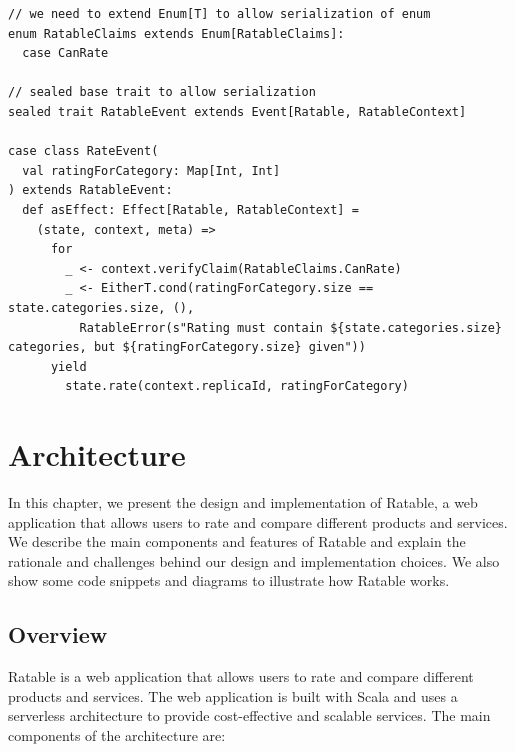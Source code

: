 \documentclass[
	ngerman,
	ruledheaders=section,   %
	class=report,		    %
	thesis={type=bachelor}, %
	accentcolor=9c,			%
	custommargins=true,    %
	marginpar=false,        %
	parskip=half-,          %
	fontsize=11pt,          %
]{tudapub}
\begin{document}
\begin{lstlisting}
// we need to extend Enum[T] to allow serialization of enum
enum RatableClaims extends Enum[RatableClaims]:
  case CanRate

// sealed base trait to allow serialization
sealed trait RatableEvent extends Event[Ratable, RatableContext]

case class RateEvent(
  val ratingForCategory: Map[Int, Int]
) extends RatableEvent:
  def asEffect: Effect[Ratable, RatableContext] =
    (state, context, meta) =>
      for
        _ <- context.verifyClaim(RatableClaims.CanRate)
        _ <- EitherT.cond(ratingForCategory.size == state.categories.size, (),
          RatableError(s"Rating must contain ${state.categories.size} categories, but ${ratingForCategory.size} given"))
      yield
        state.rate(context.replicaId, ratingForCategory)
\end{lstlisting}

\chapter{Architecture}

In this chapter, we present the design and implementation of Ratable, a web application that allows users to rate and compare different products and services. We describe the main components and features of Ratable and explain the rationale and challenges behind our design and implementation choices. We also show some code snippets and diagrams to illustrate how Ratable works.

\section{Overview}

Ratable is a web application that allows users to rate and compare different products and services. The web application is built with Scala and uses a serverless architecture to provide cost-effective and scalable services. The main components of the architecture are:
\end{document}
